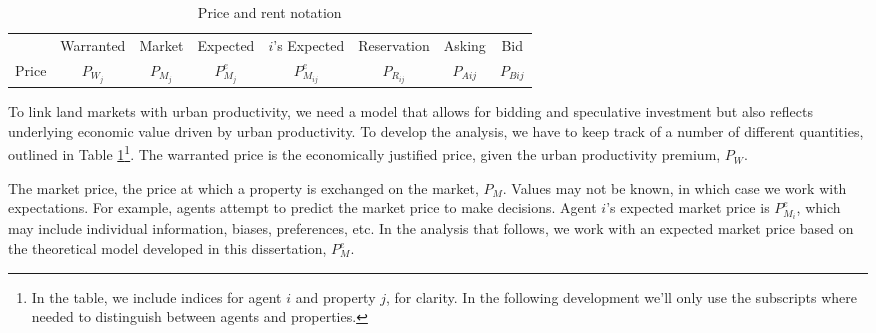\begin{table}[]
\centering
\begin{tabular}{r|c|c|c|c|c|c|c|}\cline{2-8}
       & Warranted  & Market & Expected & $i$'s Expected & Reservation & Asking & Bid     \\ \cline{2-8}
Price  & $P_{W_j}$      & $P_{M_j}$  & $P_{M_j}^e$ & $P_{M_{ij}}^{e}$     & $P_{R_{ij}}$       & $P_{A{ij}}$  & $P_{B{ij}}$   \\ \cline{2-8}
\end{tabular}
\caption{Price and rent notation}
\label{table-price-notation}
\end{table}

To link land markets with urban productivity, we need a model that allows for bidding and speculative investment but also reflects underlying economic value driven by urban productivity. 
To develop the analysis, we have to keep track of a number of different quantities, outlined in Table \ref{table-price-notation}\footnote{In the table, we include indices for agent $i$ and property $j$, for clarity. In the following development we'll only use the subscripts where needed to distinguish between agents and properties.}. 
The \gls{warranted price} is the economically justified price, given the urban productivity premium, $P_W$.

The \gls{market price}, the price at which a property is exchanged on the market, $P_M$. 
Values may not be known, in which case we work with \glspl{expectation}. For example, agents attempt to predict the market price to make decisions. Agent $i$'s expected market price is 
$P_{M_i}^e$, which may include individual information, biases, preferences, etc.
In the analysis that follows, we work with an \gls{expected market price} based on the theoretical model developed in this dissertation, $P_M^{e}$.

